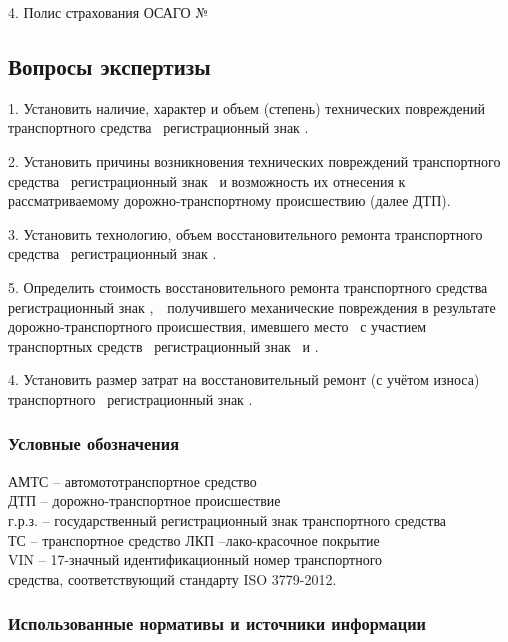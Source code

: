 4. Полис страхования  ОСАГО №  \polis
                                                              

\subsection{Вопросы  экспертизы}
      
1. Установить наличие, характер и объем (степень) технических повреждений транспортного средства  \tc\, регистрационный знак .

2. Установить причины возникновения технических повреждений транспортного средства \, регистрационный знак \, и возможность их отнесения к рассматриваемому дорожно-транспортному происшествию (далее ДТП).

3. Установить технологию, объем восстановительного  ремонта транспортного средства \tc\, регистрационный знак .


5. Определить стоимость восстановительного ремонта  транспортного средства \tc\, регистрационный знак ,\, \, получившего механические повреждения в результате дорожно-транспортного происшествия, имевшего место \, с участием транспортных средств \, регистрационный знак \, и \tcb.


4. Установить размер затрат на восстановительный ремонт (с учётом износа) транспортного  \, регистрационный знак .



  
\subsubsection{Условные обозначения}

\noindent АМТС – автомототранспортное средство\\
ДТП – дорожно-транспортное происшествие\\
г.р.з. – государственный регистрационный знак транспортного средства\\
ТС – транспортное средство
ЛКП –лако-красочное покрытие\\
VIN – 17-значный идентификационный номер транспортного\\ средства, соответствующий стандарту ISO 3779-2012. 


\subsubsection{Использованные нормативы и источники информации}

